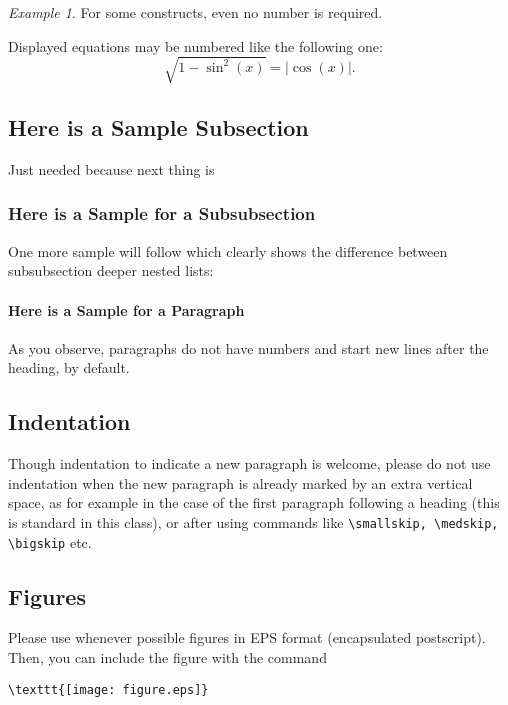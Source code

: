 \documentclass{birkjour}
\theoremstyle{definition}
\theoremstyle{remark}
\newtheorem*{ex}{Example}
\numberwithin{equation}{section}
\begin{document}
\begin{ex}
For some constructs, even no number is required.
\end{ex}

Displayed equations may be numbered like the following one:
\begin{equation}
\sqrt{1-\sin^2(x)}=|\cos(x)|.
\end{equation}

\subsection{Here is a Sample Subsection}

Just needed because next thing is

\subsubsection{Here is a Sample for a Subsubsection}

One more sample will follow which clearly shows the difference between subsubsection deeper nested lists:

\paragraph{Here is a Sample for a Paragraph}

As you observe, paragraphs do not have numbers and start new lines after the heading, by default.

\subsection{Indentation}
Though indentation to indicate a new paragraph is welcome, please
do not use indentation when the new paragraph is already marked by
an extra vertical space, as for example in the case of the first
paragraph following a heading (this is standard in this class), or
after using commands like
\verb+\smallskip, \medskip, \bigskip+ etc.


\subsection{Figures}

Please use whenever possible figures in EPS format (encapsulated
postscript). Then, you can include the figure with
the command

\begin{verbatim}\texttt{[image: figure.eps]}\end{verbatim}
\end{document}
